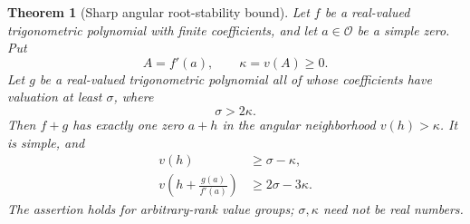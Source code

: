 \documentclass[11pt,letterpaper]{article}
\newtheorem{theorem}{Theorem}[section]
\theoremstyle{definition}
\theoremstyle{remark}
\newcommand{\OO}{\mathcal O}\newcommand{\mm}{\mathfrak m}
\numberwithin{equation}{section}
\begin{document}
\begin{theorem}[Sharp angular root-stability bound]\label{thm:stability}
Let $f$ be a real-valued trigonometric polynomial with finite coefficients, and let $a\in\OO$ be a simple zero. Put
\[
 A=f'(a),\qquad \kappa=v(A)\ge0.
\]
Let $g$ be a real-valued trigonometric polynomial all of whose coefficients have valuation at least $\sigma$, where
\begin{equation}\label{eq:stabilitythreshold}
 \sigma>2\kappa.
\end{equation}
Then $f+g$ has exactly one zero $a+h$ in the angular neighborhood $v(h)>\kappa$. It is simple, and
\begin{align}
 v(h)&\ge\sigma-\kappa,\label{eq:stabilityfirst}\\
 v\left(h+\frac{g(a)}{f'(a)}\right)&\ge2\sigma-3\kappa.
 \label{eq:stabilitysecond}
\end{align}
The assertion holds for arbitrary-rank value groups; $\sigma,\kappa$ need not be real numbers.
\end{theorem}
\end{document}
